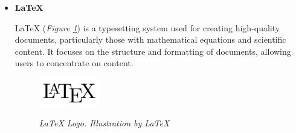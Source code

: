 \begin{itemize}
  \item \textbf{LaTeX}

    LaTeX (\textit{Figure \ref{fig:latex-logo}}) is a typesetting system used for creating high-quality documents, particularly those with mathematical equations and scientific content. It focuses on the structure and formatting of documents, allowing users to concentrate on content.

    \begin{figure}[H]
      \centering
      \begin{adjustbox}{trim=0cm 0cm, clip}
        \includegraphics[width=0.25\textwidth]{imatges/studies_and_decisions/latex-logo.png}
      \end{adjustbox}
      \caption[LaTeX Logo]{\textit{LaTeX Logo. Illustration by LaTeX}}
      {\label{fig:latex-logo}}
    \end{figure}
\end{itemize}
